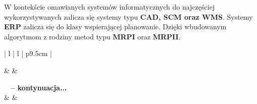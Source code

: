 		W kontekście omawianych systemów informatycznych do najczęściej wykorzystywanych zalicza się systemy typu
		\textbf{CAD, SCM oraz WMS}. Systemy \textbf{ERP} zalicza się do klasy wspierającej planowanie. Dzięki 
		wbudowanym algorytmom z rodziny metod typu \textbf{MRPI} oraz \textbf{MRPII}.
		
		\begin{center}
			\begin{longtable}{| l | l | p{9.5cm} |}
			
					\hline
							& 
							&
							\\
					\hline
					\endfirsthead
					
					{{\bfseries \tablename\ \thetable{} -- kontynuacja...}} \\
					\hline 
							& 
							&
							\\
					\hline 
					\endhead	
					
					\hline
						 \\ \hline
					\endfoot
	
					\hline \hline
					\endlastfoot			
					

\end{longtable}
\end{center}

